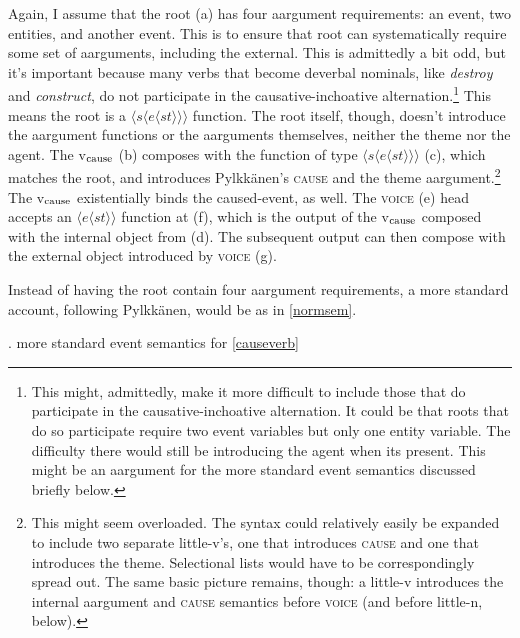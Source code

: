 \documentclass[12pt]{article}
\newcommand*{\textsub}[1]{\ensuremath{_\textrm{{\scriptsize #1}}}}
\begin{document}
\noindent Again, I assume that the root (a) has four aargument requirements: an event, two entities, and another event. This is to ensure that root can systematically require some set of aarguments, including the external. This is admittedly a bit odd, but it's important because many verbs that become deverbal nominals, like \textit{destroy} and \textit{construct}, do not participate in the causative-inchoative alternation.\footnote{ This might, admittedly, make it more difficult to include those that do participate in the causative-inchoative alternation. It could be that roots that do so participate require two event variables but only one entity variable. The difficulty there would still be introducing the agent when its present. This might be an aargument for the more standard event semantics discussed briefly below.} This means the root is a $\langle s\langle e \langle st \rangle \rangle \rangle$ function. The root itself, though, doesn't introduce the aargument functions or the aarguments themselves, neither the theme nor the agent. The v\textsub{cause} (b) composes with the function of type $\langle s\langle e \langle st \rangle \rangle \rangle$ (c), which matches the root, and introduces Pylkkänen's \textsc{cause} and the theme aargument.\footnote{ This might seem overloaded. The syntax could relatively easily be expanded to include two separate little-v's, one that introduces \textsc{cause} and one that introduces the theme. Selectional lists would have to be correspondingly spread out. The same basic picture remains, though: a little-v introduces the internal aargument and \textsc{cause} semantics before \textsc{voice} (and before little-n, below).} The v\textsub{cause} existentially binds the caused-event, as well. The \textsc{voice} (e) head accepts an $\langle e \langle st \rangle \rangle$ function at (f), which is the output of the v\textsub{cause} composed with the internal object from (d). The subsequent output can then compose with the external object introduced by \textsc{voice} (g).

Instead of having the root contain four aargument requirements, a more standard account, following Pylkkänen, would be as in \ref{normsem}.

\singlespacing

\ex. \label{normsem} more standard event semantics for \ref{causeverb}
\end{document}
